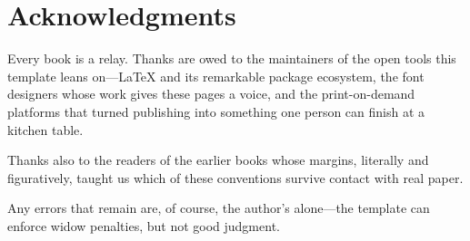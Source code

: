 \chapter{Acknowledgments}

Every book is a relay. Thanks are owed to the maintainers of the open
tools this template leans on---\LaTeX{} and its remarkable package
ecosystem, the font designers whose work gives these pages a voice, and
the print-on-demand platforms that turned publishing into something one
person can finish at a kitchen table.

Thanks also to the readers of the earlier books whose margins,
literally and figuratively, taught us which of these conventions
survive contact with real paper.

\scenebreak

Any errors that remain are, of course, the author's alone---the
template can enforce widow penalties, but not good judgment.
